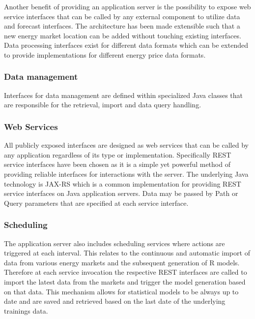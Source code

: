 Another benefit of providing an application server is the possibility to expose web service interfaces that can be called by any external component to utilize data and forecast interfaces. The architecture has been made extensible such that a new energy market location can be added without touching existing interfaces. 
Data processing interfaces exist for different data formats which can be extended to provide implementations for different energy price data formats. 

\subsubsection{Data management}

Interfaces for data management are defined within specialized Java classes that are responsible for the retrieval, import and data query handling. 

\subsubsection{Web Services}

All publicly exposed interfaces are designed as web services that can be called by any application regardless of its type or implementation. Specifically REST service interfaces have been chosen as it is a simple yet powerful method of providing reliable interfaces for interactions with the server. The underlying Java technology is JAX-RS which is a common implementation for providing REST service interfaces on Java application servers. Data may be passed by Path or Query parameters that are specified at each service interface. 

\subsubsection{Scheduling}

The application server also includes scheduling services where actions are triggered at each interval. This relates to the continuous and automatic import of data from various energy markets and the subsequent generation of R models. Therefore at each service invocation the respective REST interfaces are called to import the latest data from the markets and trigger the model generation based on that data. This mechanism allows for statistical models to be always up to date and are saved and retrieved based on the last date of the underlying trainings data. 



